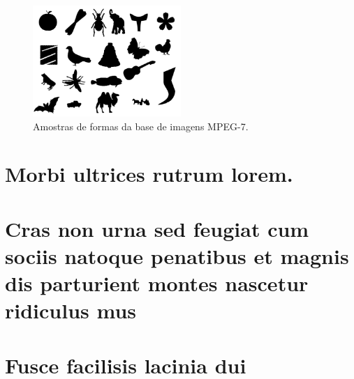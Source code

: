 \documentclass[
	12pt,				%
	openright,			%
	twoside,			%
	a4paper,			%
	english,			%
  	brazil				%
	]{abntex2}
\begin{document}
\begin{apendicesenv}
\begin{figure}[h!]
  \caption{\label{fig:db3} Amostras de formas da base de imagens MPEG-7.}
  \centering
  \includegraphics[width=0.5\textwidth]{mpeg7.png}
\end{figure}


\end{apendicesenv}



\begin{anexosenv}

\partanexos

\chapter{Morbi ultrices rutrum lorem.}
\lipsum[30]

\chapter{Cras non urna sed feugiat cum sociis natoque penatibus et magnis dis
parturient montes nascetur ridiculus mus}

\lipsum[31]

\chapter{Fusce facilisis lacinia dui}

\lipsum[32]

\end{anexosenv}

\printindex
\end{document}
